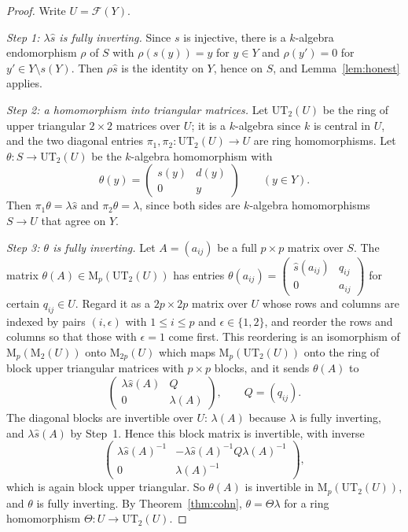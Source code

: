 \documentclass[11pt]{amsart}
\theoremstyle{plain}
\theoremstyle{definition}
\theoremstyle{remark}
\newcommand{\M}{\mathrm M}
\newcommand{\UT}{\mathrm{UT}_2}
\newcommand{\ff}[1]{\mathcal F(#1)}
\begin{document}
\begin{proof}
Write $U=\ff Y$.

\emph{Step 1: $\lambda\hat s$ is fully inverting.} Since $s$ is injective, there is a $k$-algebra endomorphism $\rho$ of $S$ with $\rho(s(y))=y$ for $y\in Y$ and $\rho(y')=0$ for $y'\in Y\setminus s(Y)$. Then $\rho\hat s$ is the identity on $Y$, hence on $S$, and Lemma~\ref{lem:honest} applies.

\emph{Step 2: a homomorphism into triangular matrices.} Let $\UT(U)$ be the ring of upper triangular $2\times2$ matrices over $U$; it is a $k$-algebra since $k$ is central in $U$, and the two diagonal entries $\pi_1,\pi_2\colon\UT(U)\to U$ are ring homomorphisms. Let $\theta\colon S\to\UT(U)$ be the $k$-algebra homomorphism with
\[
\theta(y)=\begin{pmatrix}s(y)&d(y)\\0&y\end{pmatrix}\qquad(y\in Y).
\]
Then $\pi_1\theta=\lambda\hat s$ and $\pi_2\theta=\lambda$, since both sides are $k$-algebra homomorphisms $S\to U$ that agree on $Y$.

\emph{Step 3: $\theta$ is fully inverting.} Let $A=(a_{ij})$ be a full $p\times p$ matrix over $S$. The matrix $\theta(A)\in\M_p(\UT(U))$ has entries $\theta(a_{ij})=\left(\begin{smallmatrix}\hat s(a_{ij})&q_{ij}\\0&a_{ij}\end{smallmatrix}\right)$ for certain $q_{ij}\in U$. Regard it as a $2p\times2p$ matrix over $U$ whose rows and columns are indexed by pairs $(i,\epsilon)$ with $1\le i\le p$ and $\epsilon\in\{1,2\}$, and reorder the rows and columns so that those with $\epsilon=1$ come first. This reordering is an isomorphism of $\M_p(\M_2(U))$ onto $\M_{2p}(U)$ which maps $\M_p(\UT(U))$ onto the ring of block upper triangular matrices with $p\times p$ blocks, and it sends $\theta(A)$ to
\[
\begin{pmatrix}\lambda\hat s(A)&Q\\0&\lambda(A)\end{pmatrix},\qquad Q=(q_{ij}).
\]
The diagonal blocks are invertible over $U$: $\lambda(A)$ because $\lambda$ is fully inverting, and $\lambda\hat s(A)$ by Step~1. Hence this block matrix is invertible, with inverse
\[
\begin{pmatrix}\lambda\hat s(A)^{-1}&-\lambda\hat s(A)^{-1}Q\lambda(A)^{-1}\\0&\lambda(A)^{-1}\end{pmatrix},
\]
which is again block upper triangular. So $\theta(A)$ is invertible in $\M_p(\UT(U))$, and $\theta$ is fully inverting. By Theorem~\ref{thm:cohn}, $\theta=\Theta\lambda$ for a ring homomorphism $\Theta\colon U\to\UT(U)$.


\end{proof}
\end{document}
